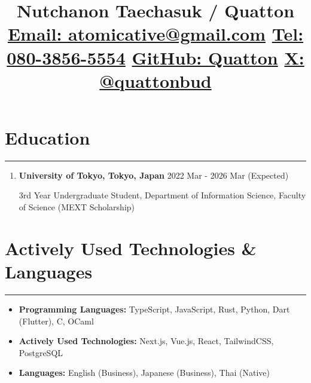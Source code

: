 \documentclass[
  a4paper,
  10pt,
  dvipdfmx
]{article}
\begin{document}
\newcommand{\cvsection}[1]{
  \section*{#1}
  \hrule
  \bigskip
}

\title{
  \vspace{-2cm}Nutchanon Taechasuk / Quatton \\
  \vspace{0.25cm}
  \small{
    \href{mailto:atomicative@gmail.com}{Email: atomicative@gmail.com}
    \hfill
    \href{tel:+8180-3856-5554}{Tel: 080-3856-5554}
    \hfill
    \href{http://github.com/Quatton}{GitHub: Quatton}
    \hfill
    \href{http://x.com/quattonbud}{X: @quattonbud}
  }
  \vspace{-1.5cm}
}
\date{}
\maketitle
{}

\cvsection{Education}
\begin{enumerate}[]
  \item \textbf{University of Tokyo, Tokyo, Japan} \hfill 2022 Mar - 2026 Mar (Expected)

        3rd Year Undergraduate Student, Department of Information Science, Faculty of Science (MEXT Scholarship)
\end{enumerate}


\cvsection{Actively Used Technologies \& Languages}

\begin{itemize}
  \itemsep0em
  \item \textbf{Programming Languages:} TypeScript, JavaScript, Rust, Python, Dart (Flutter), C, OCaml
  \item \textbf{Actively Used Technologies:} Next.js, Vue.js, React, TailwindCSS, PostgreSQL
  \item \textbf{Languages:} English (Business), Japanese (Business), Thai (Native)
\end{itemize}
\end{document}
